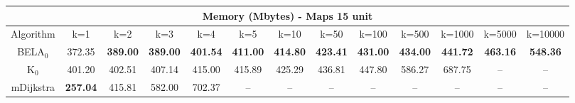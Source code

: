 \begin{tabular}{c|cccccccccccc}\toprule
\multicolumn{13}{c}{Memory (Mbytes) - Maps 15 unit}\\ \midrule
Algorithm & k=1 & k=2 & k=3 & k=4 & k=5 & k=10 & k=50 & k=100 & k=500 & k=1000 & k=5000 & k=10000 \\ \midrule
BELA$_0$ & 372.35 & \textbf{389.00} & \textbf{389.00} & \textbf{401.54} & \textbf{411.00} & \textbf{414.80} & \textbf{423.41} & \textbf{431.00} & \textbf{434.00} & \textbf{441.72} & \textbf{463.16} & \textbf{548.36} \\
K$_0$ & 401.20 & 402.51 & 407.14 & 415.00 & 415.89 & 425.29 & 436.81 & 447.80 & 586.27 & 687.75 & -- & -- \\
mDijkstra & \textbf{257.04} & 415.81 & 582.00 & 702.37 & -- & -- & -- & -- & -- & -- & -- & -- \\ \bottomrule 
\end{tabular}
